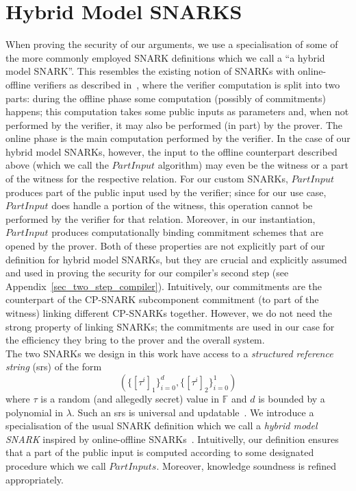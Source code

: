 \section{Hybrid Model SNARKS}
\label{sec:snarks_defs}
\noindent When proving the security of our arguments, we use a specialisation of some of the more commonly employed SNARK definitions which we call a ``a hybrid model SNARK''. 
This resembles the existing notion of SNARKs with online-offline verifiers as described in~\cite{HP_paper}, where the 
verifier computation is split into two parts: during the offline phase some computation (possibly of commitments) happens; this computation takes some public inputs as parameters and, 
when not performed by the verifier, it may also be performed (in part) by the prover. The online phase is the main computation performed by the verifier. In the case of our hybrid model 
SNARKs, however, the input to the offline counterpart described above (which we call the $\mathit{PartInput}$ algorithm) may even be the witness or 
a part of the witness for the respective relation. For our custom SNARKs, $\mathit{PartInput}$ produces part of the public input used by the verifier; 
since for our use case, $\mathit{PartInput}$ does handle a portion of the witness, this operation cannot be performed by the verifier for that relation. 
Moreover, in our instantiation, $\mathit{PartInput}$ produces computationally binding commitment schemes that are opened by the prover. Both of these properties 
are not explicitly part of our definition for hybrid model SNARKs, but they are crucial and explicitly assumed and used 
in proving the security for our compiler's second step (see Appendix~\ref{sec_two_step_compiler}). Intuitively, our commitments 
are the counterpart of the CP-SNARK subcomponent commitment (to part of the witness) linking different CP-SNARKs together. 
However, we do not need the strong property of linking SNARKs; the commitments are used in our case for the efficiency they bring to the prover and the overall system.\\

\noindent The two SNARKs we design in this work have access to a \emph{structured reference string} (srs) of the form 
$$(\{[\tau^i]_1\}_{i=0}^{d}, \{[\tau^i]_2\}_{i=0}^{1})$$ where $\tau$ is a random (and allegedly secret) value in $\mathbb{F}$ and $d$ 
is bounded by a polynomial in $\lambda$. Such an srs is universal and updatable~\cite{updatable_universal_srs_2018}. 
We introduce a specialisation of the usual SNARK definition which we call a \emph{hybrid model SNARK} inspired by online-offline SNARKs~\cite{HP_paper}. Intuitivelly, our definition ensures that a 
part of the public input is computed according to some designated procedure which we call $\mathit{PartInputs}$. Moreover, knowledge soundness is refined appropriately. 

